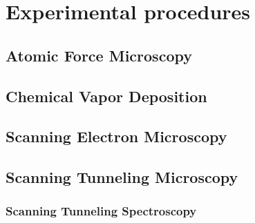 \documentclass[10pt,a4paper,twoside
,BCOR=8mm				%
,headings=normal		%
,headsepline			%
,footsepline			%
]{scrbook}
\begin{document}
 \frontmatter{}			 														%
 \setcounter{tocdepth}{1}														%
	\tableofcontents{}														 	%
 	\listoffigures														 		%
 	\listoftables																%
\mainmatter{}
\chapter{Experimental procedures}
  \section{\textbf{A}tomic \textbf{F}orce \textbf{M}icroscopy}
     
  \section{\textbf{C}hemical \textbf{V}apor \textbf{D}eposition}
	 
  \section{\textbf{S}canning \textbf{E}lectron \textbf{M}icroscopy}
	 
  \section{\textbf{S}canning \textbf{T}unneling \textbf{M}icroscopy}
     
     \subsection{\textbf{S}canning \textbf{T}unneling \textbf{S}pectroscopy}
 	 	
\end{document}
